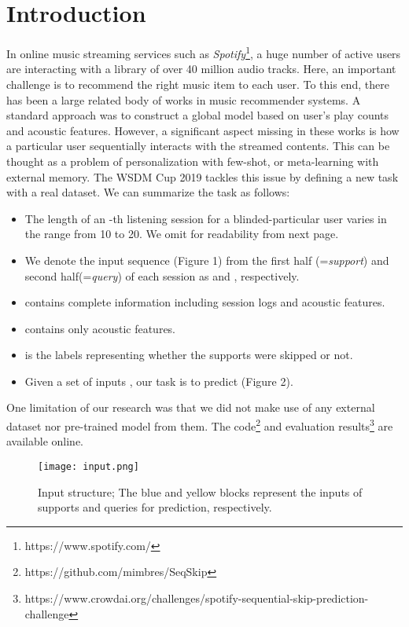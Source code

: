 
\section{Introduction}
In online music streaming services such as {\it Spotify}\footnote{https://www.spotify.com/}, a huge number of active users are interacting with a library of over 40 million audio tracks. Here, an important challenge is to recommend the right music item to each user. To this end, there has  been a large related body of works in music recommender systems. A standard approach was to construct a global model based on user's play counts\cite{celma2010music, van2013deep} and acoustic features\cite{van2013deep}. However, a significant aspect missing in these works is how a particular user sequentially interacts with the streamed contents. This can be thought as a problem of  personalization\cite{cho2002personalized} with few-shot, or meta-learning\cite{snail} with external memory\cite{santoro2016meta}. The WSDM Cup 2019 tackles this issue by defining a new task with a real dataset\cite{brost2019music}. We can summarize the task as follows:
\begin{itemize}
\item The length  of an -th listening session for a blinded-particular user varies in the range from 10 to 20. We omit  for readability from next page.
\item We denote the input sequence (Figure 1) from the first half (={\it support}) and second half(={\it query}) of each session  as  and  , respectively.
\item  contains complete information including session logs and acoustic features.
\item  contains only acoustic features.
\item  is the labels representing whether the supports were skipped or not.
\item Given a set of inputs , our task is to predict  (Figure 2).
\end{itemize}

One limitation of our research was that we did not make use of any external dataset nor pre-trained model from them. The code\footnote{https://github.com/mimbres/SeqSkip} and evaluation results\footnote{https://www.crowdai.org/challenges/spotify-sequential-skip-prediction-challenge} are available online.

\begin{figure*}
\texttt{[image: input.png]}
\caption{Input structure; The blue and yellow blocks represent the inputs of supports and queries for prediction, respectively.}
\end{figure*}


